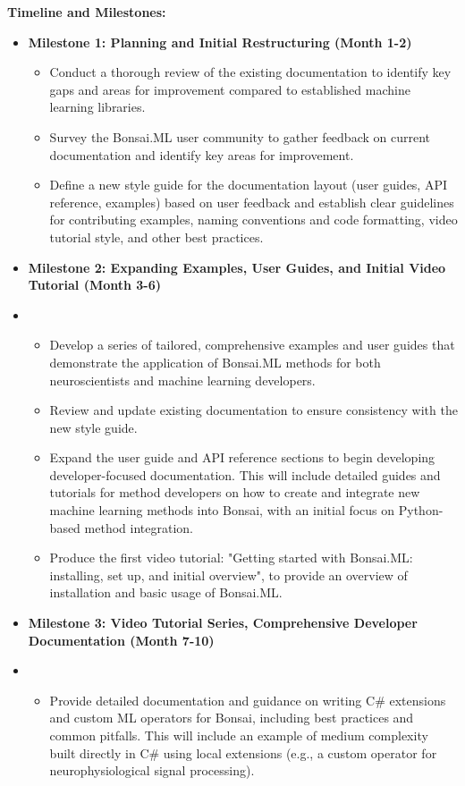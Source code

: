 \textbf{Timeline and Milestones:}
\begin{itemize}
    \item \textbf{Milestone 1: Planning and Initial Restructuring (Month 1-2)}
    \begin{itemize}
        \item Conduct a thorough review of the existing documentation to identify key gaps and areas for improvement compared to established machine learning libraries.
        \item Survey the Bonsai.ML user community to gather feedback on current documentation and identify key areas for improvement.
        \item Define a new style guide for the documentation layout (user guides, API reference, examples) based on user feedback and establish clear guidelines for contributing examples, naming conventions and code formatting, video tutorial style, and other best practices.
    \end{itemize}
    \item \textbf{Milestone 2: Expanding Examples, User Guides, and Initial Video Tutorial (Month 3-6)}
    \item \begin{itemize}
        \item Develop a series of tailored, comprehensive examples and user guides that demonstrate the application of Bonsai.ML methods for both neuroscientists and machine learning developers.
        \item Review and update existing documentation to ensure consistency with the new style guide.
        \item Expand the user guide and API reference sections to begin developing developer-focused documentation. This will include detailed guides and tutorials for method developers on how to create and integrate new machine learning methods into Bonsai, with an initial focus on Python-based method integration.
        \item Produce the first video tutorial: "Getting started with Bonsai.ML: installing, set up, and initial overview", to provide an overview of installation and basic usage of Bonsai.ML.
    \end{itemize}
    \item \textbf{Milestone 3: Video Tutorial Series, Comprehensive Developer Documentation (Month 7-10)}
    \item \begin{itemize}
        \item Provide detailed documentation and guidance on writing C# extensions and custom ML operators for Bonsai, including best practices and common pitfalls. This will include an example of medium complexity built directly in C\# using local extensions (e.g., a custom operator for neurophysiological signal processing).

\end{itemize}
\end{itemize}
